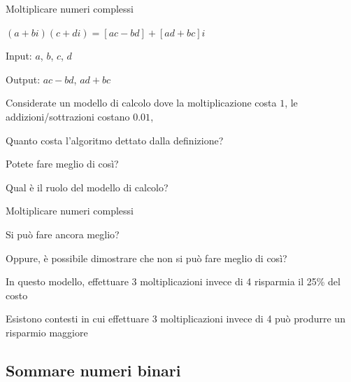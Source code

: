 \begin{frame}{Moltiplicare numeri complessi}

\vspace{-9pt}
\begin{myboxtitle}
\BI
\item $(a + bi)(c + di) = [ac-bd] + [ad + bc] i$
\item Input: $a$, $b$, $c$, $d$
\item Output: $ac-bd$, $ad+bc$
\EI
\end{myboxtitle}

\begin{myboxtitle}[Domande]
Considerate un modello di calcolo dove la moltiplicazione costa $1$, le addizioni/sottrazioni costano $0.01$,
\BI
\item Quanto costa l'algoritmo dettato dalla definizione?
\item Potete fare meglio di così? 
\item Qual è il ruolo del modello di calcolo?
\EI
\end{myboxtitle}	

\end{frame}

\begin{frame}{Moltiplicare numeri complessi}

\vspace{-9pt}
\begin{myboxtitle}
\BI
\item Si può fare ancora meglio? 
\item Oppure, è possibile dimostrare che non si può fare meglio di così?
\EI
\end{myboxtitle}

\begin{myboxtitle}
\BI
\item In questo modello, effettuare 3 moltiplicazioni invece di 4 risparmia il 25\% del costo
\item Esistono contesti in cui effettuare 3 moltiplicazioni invece di 4 può produrre un risparmio maggiore
\EI
\end{myboxtitle}

\end{frame}

\subsection{Sommare numeri binari}

